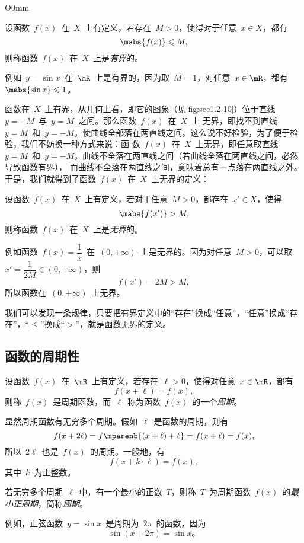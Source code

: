 \begin{wrapfigure}{O}{0mm}
\somefigure
\caption{有界函数}\label{fig:sec1.2-10}
\end{wrapfigure}

设函数~$f(x)$~在~$X$~上有定义，若存在~$M>0$，使得对于任意~$x\in X$，都有
\[
  \mabs{f(x)}\leq M,
\]
则称函数~$f(x)$~在~$X$~上是\emph{有界}的。

例如~$y=\sin x$~在~$\mR$~上是有界的，因为取~$M=1$，对任意~$x\in\mR$，都有~$\mabs{\sin x}\leq1$。

函数在~$X$~上有界，从几何上看，即它的图象（见\ref{fig:sec1.2-10}）位于直线~$y=-M$~与~$y=M$~之间。那么函数~$f(x)$~在~$X$~上
无界，即找不到直线~$y=M$~和~$y=-M$，使曲线全部落在两直线之间。这么说不好检验，为了便于检验，我们不妨换一种方式来说：函
数~$f(x)$~在~$X$~上无界，即任意取直线~$y=M$~和~$y=-M$，曲线不全落在两直线之间（若曲线全落在两直线之间，必然导致函数有界），%
而曲线不全落在两直线之间，意味着总有一点落在两直线之外。%
于是，我们就得到了函数~$f(x)$~在~$X$~上无界的定义：

设函数~$f(x)$~在~$X$~上有定义，若对于任意~$M>0$，都存在~$x'\in X$，使得
\[
  \mabs{f(x')}>M,
\]
则称函数~$f(x)$~在~$X$~上是\emph{无界}的。

例如函数~$f(x)=\dfrac1x$~在~$(0,+\infty)$~上是无界的。因为对任意~$M>0$，可以取~$x'=\dfrac1{2M}\in(0,+\infty)$，则
\[
  f(x')=2M>M,
\]
所以函数在~$(0,+\infty)$~上无界。

我们可以发现一条规律，只要把有界定义中的“存在”换成“任意”，“任意”换成“存在”，“$\leq$”换成“$>$”，就是函数无界的定义。

\subsection{函数的周期性}

设函数~$f(x)$~在~$\mR$~上有定义，若存在~$\ell>0$，使得对任意~$x\in\mR$，都有
\[
  f(x+\ell)=f(x),
\]
则称~$f(x)$~是周期函数，而~$\ell$~称为函数~$f(x)$~的一个\emph{周期}。

显然周期函数有无穷多个周期。假如~$\ell$~是函数的周期，则有
\[
  f(x+2\ell)=f\mparenb{(x+\ell)+\ell}=f(x+\ell)=f(x),
\]
所以~$2\ell$~也是~$f(x)$~的周期。一般地，有
\[
  f(x+k\cdot\ell)=f(x),
\]
其中~$k$~为正整数。

若无穷多个周期~$\ell$~中，有一个最小的正数~$T$，则称~$T$~为周期函数~$f(x)$~的\emph{最小正周期}，简称\emph{周期}。

例如，正弦函数~$y=\sin x$~是周期为~$2\pi$~的函数，因为
\[
  \sin(x+2\pi)=\sin x。
\]

